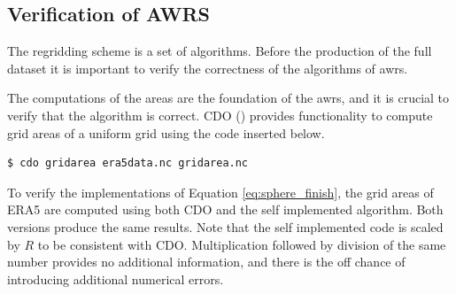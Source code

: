 \subsection{Verification of AWRS}
The regridding scheme is a set of algorithms. Before the production of the full dataset it is important to verify the correctness of the algorithms of \acrshort{awrs}.

The computations of the areas are the foundation of the \acrshort{awrs}, and it is crucial to verify that the algorithm is correct. CDO (\cite{cdo}) provides functionality to compute grid areas of a uniform grid using the code inserted below.
\begin{verbatim}
$ cdo gridarea era5data.nc gridarea.nc     
\end{verbatim}
To verify the implementations of Equation \eqref{eq:sphere_finish}, the grid areas of ERA5 are computed using both CDO and the self implemented algorithm. Both versions produce the same results.
Note that the self implemented code is scaled by $R$ to be consistent with CDO. Multiplication followed by division of the same number provides no additional information, and there is the off chance of introducing additional numerical errors. 

